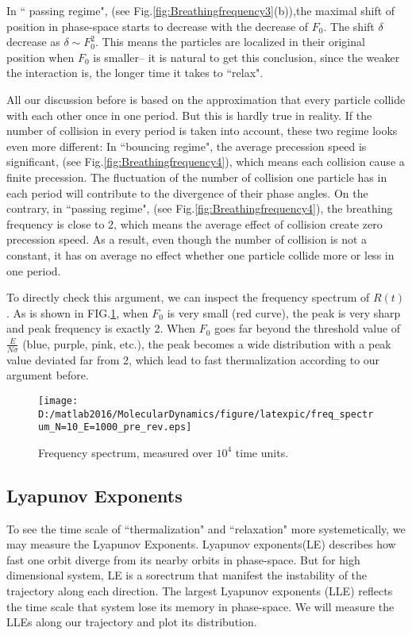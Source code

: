 \documentclass[aps,pre,twocolumn,groupedaddress]{revtex4-1}
\begin{document}
In `` passing regime", (see Fig.\ref{fig:Breathingfrequency3}(b)),the maximal shift of position in phase-space starts to decrease with the decrease of $F_0$. The shift $\delta$ decrease as $\delta\sim F_0^2$. This means the particles are localized in their original position when $F_0$ is smaller-- it is natural to get this conclusion, since the weaker the interaction is, the longer time it takes to ``relax".

All our discussion before is based on the approximation that every particle collide with each other once in one period. But this is hardly true in reality. If the number of collision in every period is taken into account, these two regime looks even more different: In ``bouncing regime", the average precession speed is significant, (see Fig.\ref{fig:Breathingfrequency4}), which means each collision cause a finite precession. The fluctuation of the number of collision one particle has in each period will contribute to the divergence of their phase angles. On the contrary, in ``passing regime", (see Fig.\ref{fig:Breathingfrequency4}), the breathing frequency is close to 2, which means the average effect of collision create zero precession speed. As a result, even though the number of collision is not a constant, it has on average no effect whether one particle collide more or less in one period. 

To directly check this argument, we can inspect the frequency spectrum of $R(t)$. As is shown in FIG.\ref{fig:frequencyspectrum}, when $F_0$ is very small (red curve), the peak is very sharp and peak frequency is exactly 2. When $F_0$ goes far beyond the threshold value of $\frac{E}{N\sigma}$ (blue, purple, pink, etc.), the peak becomes a wide distribution with a peak value deviated far from 2, which lead to  fast thermalization according to our argument before.

\begin{figure}[hbtp]
\centering
\texttt{[image: D:/matlab2016/MolecularDynamics/figure/latexpic/freq\_spectrum\_N=10\_E=1000\_pre\_rev.eps]}
\caption{Frequency spectrum, measured over $10^4$ time units.\label{fig:frequencyspectrum}}
\end{figure}

\subsection{Lyapunov Exponents}
To see the time scale of ``thermalization" and ``relaxation" more systemetically, we may measure the Lyapunov Exponents. Lyapunov exponents(LE) describes how fast one orbit diverge from its nearby orbits in phase-space. But for high dimensional system, LE is a sorectrum that manifest the instability of the trajectory along each direction. The largest Lyapunov exponents (LLE) reflects  the time scale that system lose its memory in phase-space. We will measure the LLEs along our trajectory and plot its distribution.
\end{document}
